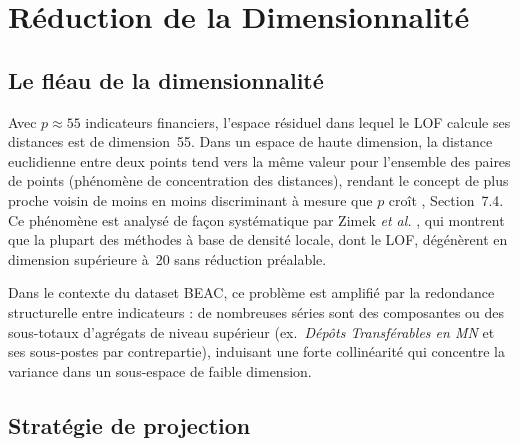 \documentclass[12pt, a4paper]{article}
\begin{document}
\section{Réduction de la Dimensionnalité}
\label{sec:reduction}

\subsection{Le fléau de la dimensionnalité}
\label{subsec:fleau_dim}

Avec $p \approx 55$ indicateurs financiers, l'espace résiduel dans lequel
le LOF calcule ses distances est de dimension~55. Dans un espace de haute
dimension, la distance euclidienne entre deux points tend vers la même valeur
pour l'ensemble des paires de points (phénomène de concentration des
distances), rendant le concept de \og{}plus proche voisin\fg{} de moins en
moins discriminant à mesure que $p$ croît \cite{breunig2000lof}, Section~7.4.
Ce phénomène est analysé de façon systématique par Zimek \textit{et al.}
\cite{zimek2012survey}, qui montrent que la plupart des méthodes à base de
densité locale, dont le LOF, dégénèrent en dimension supérieure à~20 sans
réduction préalable.

Dans le contexte du dataset BEAC, ce problème est amplifié par la redondance
structurelle entre indicateurs : de nombreuses séries sont des composantes ou
des sous-totaux d'agrégats de niveau supérieur (ex.\ \textit{Dépôts
Transférables en MN} et ses sous-postes par contrepartie), induisant une
forte collinéarité qui concentre la variance dans un sous-espace de faible
dimension.

\subsection{Stratégie de projection}
\label{subsec:projection}
\end{document}
